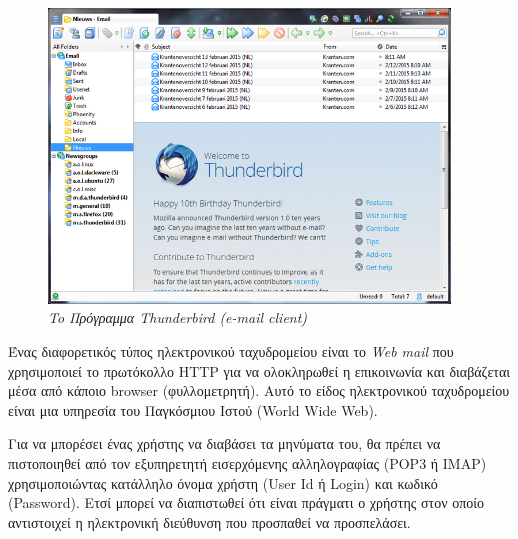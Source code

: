 \begin{figure}[!ht]
 \centering
 \includegraphics[width=0.95\textwidth]{images/chapter6/6-7}
 \caption {\textsl{To Πρόγραμμα Thunderbird (e-mail client)}}
 \label{6-7}
\end{figure}

Ένας διαφορετικός τύπος ηλεκτρονικού ταχυδρομείου είναι το \emph{Web mail} που χρησιμοποιεί το πρωτόκολλο HTTP για να ολοκληρωθεί η επικοινωνία και διαβάζεται μέσα από κάποιο browser (φυλλομετρητή). Αυτό το είδος ηλεκτρονικού ταχυδρομείου είναι μια υπηρεσία του Παγκόσμιου Ιστού (World Wide Web). 

Για να μπορέσει ένας χρήστης να διαβάσει τα μηνύματα του, θα πρέπει να πιστοποιηθεί από τον εξυπηρετητή εισερχόμενης αλληλογραφίας (POP3 ή IMAP) χρησιμοποιώντας κατάλληλο όνομα χρήστη (User Id ή Login) και κωδικό (Password). Ετσί μπορεί να διαπιστωθεί ότι είναι πράγματι ο χρήστης στον οποίο αντιστοιχεί η ηλεκτρονική διεύθυνση που προσπαθεί να προσπελάσει.